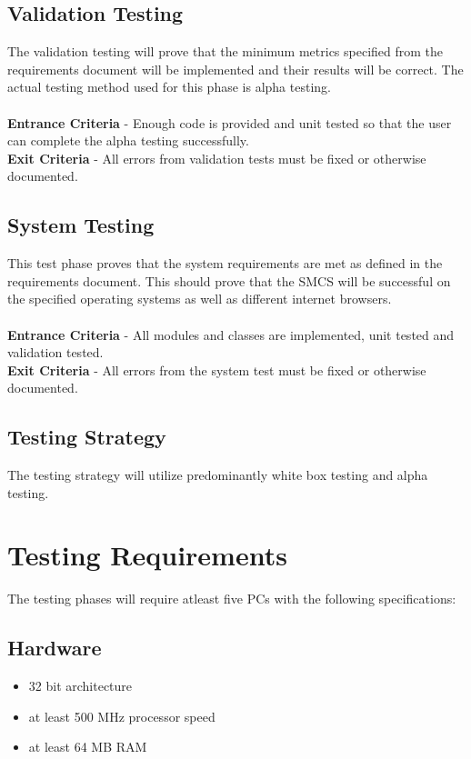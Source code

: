 \documentclass{scrreprt}
\begin{document}
	\section{Validation Testing}
	The validation testing will prove that the minimum metrics specified from the requirements document will be implemented and their results will be correct. The actual testing method used for this phase is alpha testing.\\\\
	\textbf{Entrance Criteria} - Enough code is provided and unit tested so that the user can complete the alpha testing successfully.\\
	\textbf{Exit Criteria} - All errors from validation tests must be fixed or otherwise documented.
	
	\section{System Testing}
	This test phase proves that the system requirements are met as defined in the requirements document. This should prove that the SMCS will be successful on the specified operating systems as well as different internet browsers.\\\\
	\textbf{Entrance Criteria} - All modules and classes are implemented, unit tested and validation tested.\\
	\textbf{Exit Criteria} - All errors from the system test must be fixed or otherwise documented.
	
	\section{Testing Strategy}
	The testing strategy will utilize predominantly white box testing and alpha testing.

	{\let\clearpage\relax \chapter{Testing Requirements}}
	The testing phases will require atleast five PCs with the following specifications:
	\section{Hardware}
	\begin{itemize}
		\item 32 bit architecture
		\item at least 500 MHz processor speed
		\item at least 64 MB RAM
	\end{itemize}
\end{document}
